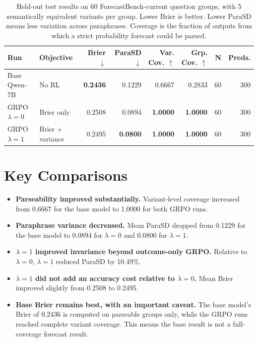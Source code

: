 \documentclass[11pt]{article}
\newcommand{\best}[1]{\cellcolor{softgreen}\textbf{#1}}
\begin{document}
\begin{table}[h!]
\centering
\scriptsize
\renewcommand{\arraystretch}{1.28}
\setlength{\tabcolsep}{3.5pt}
\begin{tabular}{llrrrrrr}
\rowcolor{headerblue}
\color{white}\textbf{Run} &
\color{white}\textbf{Objective} &
\color{white}\textbf{Brier $\downarrow$} &
\color{white}\textbf{ParaSD $\downarrow$} &
\color{white}\textbf{Var. Cov. $\uparrow$} &
\color{white}\textbf{Grp. Cov. $\uparrow$} &
\color{white}\textbf{N} &
\color{white}\textbf{Preds.} \\
\midrule
Base Qwen-7B & No RL & \best{0.2436} & 0.1229 & 0.6667 & 0.2833 & 60 & 300 \\
GRPO $\lambda=0$ & Brier only & 0.2508 & 0.0894 & \best{1.0000} & \best{1.0000} & 60 & 300 \\
GRPO $\lambda=1$ & Brier + variance & 0.2495 & \best{0.0800} & \best{1.0000} & \best{1.0000} & 60 & 300 \\
\bottomrule
\end{tabular}
\caption{Held-out test results on 60 ForecastBench-current question groups, with 5 semantically equivalent variants per group. Lower Brier is better. Lower ParaSD means less variation across paraphrases. Coverage is the fraction of outputs from which a strict probability forecast could be parsed.}
\label{tab:first-run-results}
\end{table}

\section*{Key Comparisons}

\begin{itemize}[leftmargin=*]
  \item \textbf{Parseability improved substantially.} Variant-level coverage increased from 0.6667 for the base model to 1.0000 for both GRPO runs.
  \item \textbf{Paraphrase variance decreased.} Mean ParaSD dropped from 0.1229 for the base model to 0.0894 for $\lambda=0$ and 0.0800 for $\lambda=1$.
  \item \textbf{$\lambda=1$ improved invariance beyond outcome-only GRPO.} Relative to $\lambda=0$, $\lambda=1$ reduced ParaSD by 10.49\%.
  \item \textbf{$\lambda=1$ did not add an accuracy cost relative to $\lambda=0$.} Mean Brier improved slightly from 0.2508 to 0.2495.
  \item \textbf{Base Brier remains best, with an important caveat.} The base model's Brier of 0.2436 is computed on parseable groups only, while the GRPO runs reached complete variant coverage. This means the base result is not a full-coverage forecast result.
\end{itemize}
\end{document}
